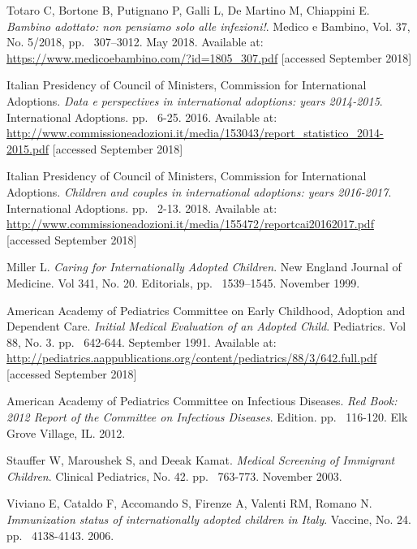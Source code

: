 \begin{thebibliography}{50}
  Totaro C, Bortone B, Putignano P, Galli L, De Martino M, Chiappini E.
  \textit{Bambino adottato: non pensiamo solo alle infezioni!}.
  Medico e Bambino, Vol. 37, No. 5/2018,
  pp. ~307–3012.
  May 2018.
  Available at: \url{https://www.medicoebambino.com/?id=1805_307.pdf} [accessed September 2018]
  
  Italian Presidency of Council of Ministers, Commission for International Adoptions.
  \textit{Data e perspectives in international adoptions: years 2014-2015}.
  International Adoptions.
  pp. ~6-25.
  2016.
  Available at: \url{http://www.commissioneadozioni.it/media/153043/report_statistico_2014-2015.pdf} [accessed September 2018]  
  
  Italian Presidency of Council of Ministers, Commission for International Adoptions.
  \textit{Children and couples in international adoptions: years 2016-2017}.
  International Adoptions.
  pp. ~2-13.
  2018.
  Available at: \url{http://www.commissioneadozioni.it/media/155472/reportcai20162017.pdf} [accessed September 2018]  
  
  Miller L.
  \textit{Caring for Internationally Adopted Children}.
  New England Journal of Medicine. Vol 341, No. 20.
  Editorials,
  pp. ~1539–1545.
  November 1999.
  
  American Academy of Pediatrics Committee on Early Childhood, Adoption and Dependent Care.
  \textit{Initial Medical Evaluation of an Adopted Child}.
  Pediatrics. Vol 88, No. 3.
  pp. ~642-644.
  September 1991.
  Available at: \url{http://pediatrics.aappublications.org/content/pediatrics/88/3/642.full.pdf} [accessed September 2018]
  
  American Academy of Pediatrics Committee on Infectious Diseases.
  \textit{Red Book: 2012 Report of the Committee on Infectious Diseases}.
   Edition.
  pp. ~116-120.
  Elk Grove Village, IL.
  2012.

  Stauffer W, Maroushek S, and Deeak Kamat.
  \textit{Medical Screening of Immigrant Children}.
  Clinical Pediatrics, No. 42.
  pp. ~763-773.
  November 2003.
  
  Viviano E, Cataldo F, Accomando S, Firenze A, Valenti RM, Romano N.
  \textit{Immunization status of internationally adopted children in Italy}.
  Vaccine, No. 24.
  pp. ~4138-4143.
  2006.
  

\end{thebibliography}
